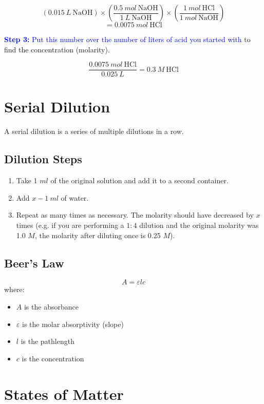 \documentclass[a4paper, 12pt]{article}
\begin{document}
$$(0.015 \: L \: \text{NaOH}) \times \left(\frac{0.5 \: mol \: \text{NaOH}}{1 \: L \: \text{NaOH}}\right) \times \left(\frac{1 \: mol \: \text{HCl}}{1 \: mol \: \text{NaOH}}\right) $$
$$=0.0075 \: mol \: \text{HCl}$$

\textcolor{blue}{\textbf{Step 3:} Put this number over the number of liters of acid you started with} to find the concentration (molarity).

$$\frac{0.0075 \: mol \: \text{HCl}}{0.025 \: L} = \boxed{0.3 \: M \: \text{HCl}}$$

\section{Serial Dilution}
A serial dilution is a series of multiple dilutions in a row.

\subsection{Dilution Steps}

\begin{enumerate}[leftmargin=*]
    \item Take 1 $ml$ of the original solution and add it to a second container.
    \item Add $x-1 \: ml$ of water.
    \item Repeat as many times as necessary. The molarity should have decreased by $x$ times (e.g. if you are performing a $1:4$ dilution and the original molarity was 1.0 $M$, the molarity after diluting once is 0.25 $M$).
\end{enumerate}

\subsection{Beer's Law}

\begin{equation}\label{beers}
A = \varepsilon l c
\end{equation}
where:
\begin{itemize}[leftmargin=*, nosep]
    \item $A$ is the absorbance
    \item $\varepsilon$ is the molar absorptivity (slope)
    \item $l$ is the pathlength
    \item $c$ is the concentration
\end{itemize}

\section{States of Matter}
\end{document}
